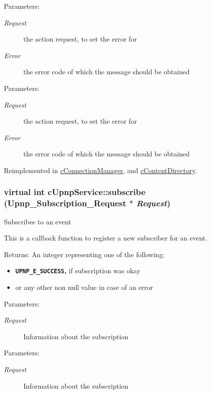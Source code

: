 \begin{Desc}
\item[Parameters:]
\begin{description}
\item[{\em Request}]the action request, to set the error for \item[{\em Error}]the error code of which the message should be obtained \end{description}
\end{Desc}
\begin{Desc}
\item[Parameters:]
\begin{description}
\item[{\em Request}]the action request, to set the error for \item[{\em Error}]the error code of which the message should be obtained \end{description}
\end{Desc}


Reimplemented in \hyperlink{classcConnectionManager_02014a637c6cb04cbfe10b3cb4ce6d1d}{cConnectionManager}, and \hyperlink{classcContentDirectory_a3b0df304987a0f2b17733c651d5b5c6}{cContentDirectory}.\hypertarget{classcUpnpService_e6d3522d580e5975f5a38d5bea88e29d}{
\subsubsection[{subscribe}]{\setlength{\rightskip}{0pt plus 5cm}virtual int cUpnpService::subscribe (Upnp\_\-Subscription\_\-Request $\ast$ {\em Request})}}
\label{classcUpnpService_e6d3522d580e5975f5a38d5bea88e29d}


Subscribes to an event

This is a callback function to register a new subscriber for an event.

\begin{Desc}
\item[Returns:]An integer representing one of the following:\begin{itemize}
\item {\bf {\tt UPNP\_\-E\_\-SUCCESS},} if subscription was okay\item or any other non null value in case of an error\end{itemize}
\end{Desc}
\begin{Desc}
\item[Parameters:]
\begin{description}
\item[{\em Request}]Information about the subscription \end{description}
\end{Desc}
\begin{Desc}
\item[Parameters:]
\begin{description}
\item[{\em Request}]Information about the subscription \end{description}
\end{Desc}


